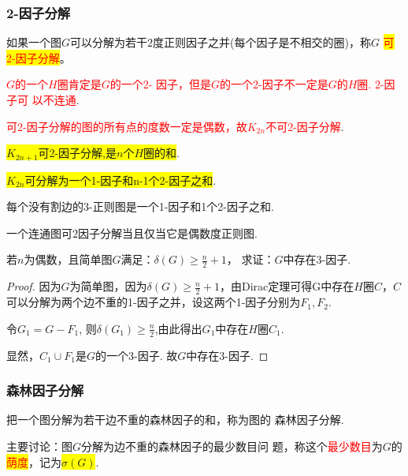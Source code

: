 \subsubsection{2-因子分解}
\begin{definition}
	如果一个图$G$可以分解为若干$2$度正则因子之并(每个因子是不相交的圈)，称$G$
	\colorbox{yellow}{\textcolor{red}{可2-因子分解}}。
\end{definition}	
\begin{note}
	\textcolor{red}{$G$的一个$H$圈肯定是$G$的一个2-
		因子，但是$G$的一个2-因子不一定是$G$的$H$圈. 2-因子可
		以不连通}.
	
	\textcolor{red}{可2-因子分解的图的所有点的度数一定是偶数，故$K_{2n}$不可2-因子分解}.
\end{note}	

\begin{theorem}
	\colorbox{yellow}{$K_{2n+1}$可2-因子分解,是$n$个$H$圈的和}.
\end{theorem}

\begin{theorem}
	\colorbox{yellow}{$K_{2n}$可分解为一个1-因子和n-1个2-因子之和}.
\end{theorem}


\begin{theorem}
	每个没有割边的3-正则图是一个1-因子和1个2-因子之和.
\end{theorem}

\begin{theorem}
	一个连通图可2因子分解当且仅当它是偶数度正则图.
\end{theorem}

\begin{example}
	若$n$为偶数，且简单图$G$满足：$\delta(G)\geq \frac{n}{2}+1$， 求证：$G$中存在3-因子.
\end{example}
\begin{proof}
	因为$G$为简单图，因为$\delta(G)\geq \frac{n}{2}+1$，由Dirac定理可得G中存在$H$圈$C$，$C$可以分解为两个边不重的1-因子之并，设这两个1-因子分别为$F_1,F_2$.
	
	令$G_1=G-F_1$, 则$\delta(G_1)\geq\frac{n}{2}$,由此得出$G_1$中存在$H$圈$C_1$.
	
	显然，$C_1\cup F_1$是$G$的一个3-因子. 故$G$中存在3-因子.
	
	
\end{proof}




\subsubsection{森林因子分解}
\begin{definition}
	把一个图分解为若干边不重的森林因子的和，称为图的
	森林因子分解.
\end{definition}
主要讨论：图$G$分解为边不重的森林因子的最少数目问
题，称这个\textcolor{red}{最少数目}为$G$的\colorbox{yellow}{\textcolor{red}{荫度}}，记为\colorbox{yellow}{$\sigma(G)$}.

